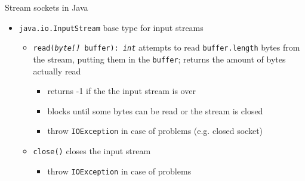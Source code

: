 \documentclass[presentation]{beamer}\mode<presentation>{\usetheme{AMSBolognaFC}}
\begin{document}
\begin{frame}[c, allowframebreaks]{Stream sockets in Java}
\begin{itemize}
        \item \texttt{java.io.\alert{InputStream}} base type for input streams 
        \begin{itemize}
            \item \alert{\texttt{read(\textit{byte[]} buffer): \textit{int}}} attempts to read \texttt{buffer.length} bytes from the stream, putting them in the \texttt{buffer}; returns the amount of bytes actually read
            \begin{itemize}
                \item returns -1 if the the input stream is over
                \item blocks until some bytes can be read or the stream is closed
                \item throw \texttt{IOException} in case of problems (e.g. closed socket)
            \end{itemize}
            \item \alert{\texttt{close()}} closes the input stream
            \begin{itemize}
                \item throw \texttt{IOException} in case of problems
            \end{itemize}
        \end{itemize}

        \framebreak


\end{itemize}
\end{frame}
\end{document}
